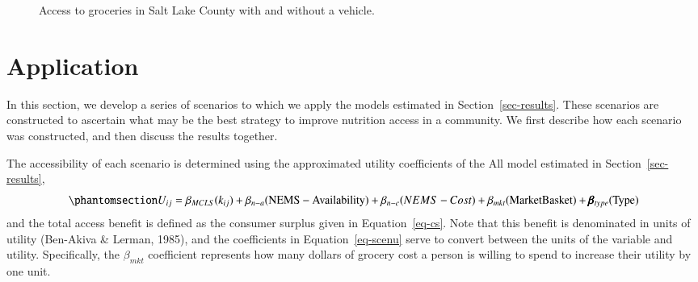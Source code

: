 \documentclass[
  letterpaper,
  number,
  review,
  3p]{elsarticle}
\begin{document}
\begin{sidewaysfigure}

\begin{minipage}{0.50\linewidth}



\end{minipage}%
%
\begin{minipage}{0.50\linewidth}



\end{minipage}%

\caption{\label{fig-map-nocar}Access to groceries in Salt Lake County
with and without a vehicle.}

\end{sidewaysfigure}%


\section{Application}\label{sec-scenarios}

In this section, we develop a series of scenarios to which we apply the
models estimated in Section~\ref{sec-results}. These scenarios are
constructed to ascertain what may be the best strategy to improve
nutrition access in a community. We first describe how each scenario was
constructed, and then discuss the results together.

The accessibility of each scenario is determined using the approximated
utility coefficients of the All model estimated in
Section~\ref{sec-results},
\begin{equation}\phantomsection\label{eq-scenu}{
U_{ij}= \beta_{MCLS}( k_{ij}) +  \beta_{n-a} (\mathrm{NEMS-Availability}) +
  \beta_{n-c}\mathrm({NEMS-Cost}) + \\ \beta_{mkt} (\mathrm{Market Basket}) + \pmb{\beta}_{type}(\mathrm{Type})  
}\end{equation} and the total access benefit is defined as the consumer
surplus given in Equation~\ref{eq-cs}. Note that this benefit is
denominated in units of utility (Ben-Akiva \& Lerman, 1985), and the
coefficients in Equation~\ref{eq-scenu} serve to convert between the
units of the variable and utility. Specifically, the \(\beta_{mkt}\)
coefficient represents how many dollars of grocery cost a person is
willing to spend to increase their utility by one unit.
\end{document}
